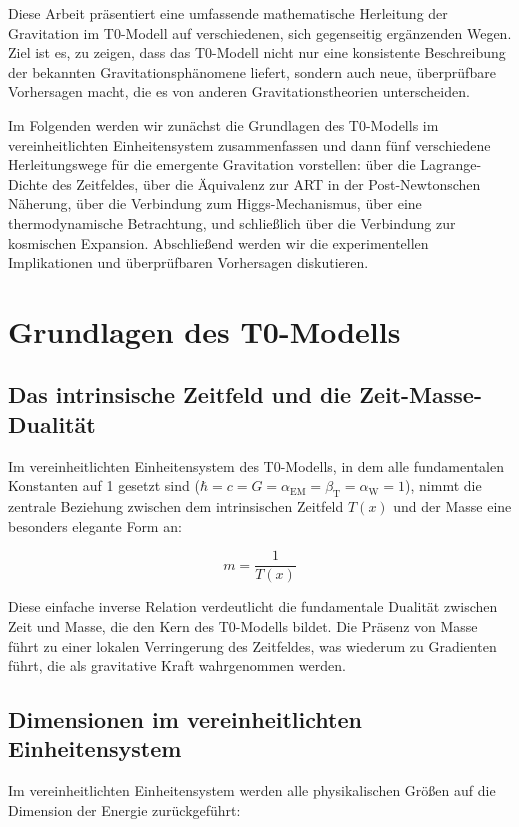 \documentclass[12pt,a4paper]{article}
\newcommand{\Tfield}{T(x)}
\newcommand{\betaT}{\beta_{\text{T}}}
\newcommand{\alphaEM}{\alpha_{\text{EM}}}
\newcommand{\alphaW}{\alpha_{\text{W}}}
\begin{document}
	Diese Arbeit präsentiert eine umfassende mathematische Herleitung der Gravitation im T0-Modell auf verschiedenen, sich gegenseitig ergänzenden Wegen. Ziel ist es, zu zeigen, dass das T0-Modell nicht nur eine konsistente Beschreibung der bekannten Gravitationsphänomene liefert, sondern auch neue, überprüfbare Vorhersagen macht, die es von anderen Gravitationstheorien unterscheiden.
	
	Im Folgenden werden wir zunächst die Grundlagen des T0-Modells im vereinheitlichten Einheitensystem zusammenfassen und dann fünf verschiedene Herleitungswege für die emergente Gravitation vorstellen: über die Lagrange-Dichte des Zeitfeldes, über die Äquivalenz zur ART in der Post-Newtonschen Näherung, über die Verbindung zum Higgs-Mechanismus, über eine thermodynamische Betrachtung, und schließlich über die Verbindung zur kosmischen Expansion. Abschließend werden wir die experimentellen Implikationen und überprüfbaren Vorhersagen diskutieren.
	
	\section{Grundlagen des T0-Modells}
	
	\subsection{Das intrinsische Zeitfeld und die Zeit-Masse-Dualität}
	Im vereinheitlichten Einheitensystem des T0-Modells, in dem alle fundamentalen Konstanten auf 1 gesetzt sind (\(\hbar = c = G = \alphaEM = \betaT = \alphaW = 1\)), nimmt die zentrale Beziehung zwischen dem intrinsischen Zeitfeld \(\Tfield\) und der Masse eine besonders elegante Form an:
	
	\begin{equation}
		m = \frac{1}{\Tfield}
	\end{equation}
	
	Diese einfache inverse Relation verdeutlicht die fundamentale Dualität zwischen Zeit und Masse, die den Kern des T0-Modells bildet. Die Präsenz von Masse führt zu einer lokalen Verringerung des Zeitfeldes, was wiederum zu Gradienten führt, die als gravitative Kraft wahrgenommen werden.
	
	\subsection{Dimensionen im vereinheitlichten Einheitensystem}
	Im vereinheitlichten Einheitensystem werden alle physikalischen Größen auf die Dimension der Energie zurückgeführt:
	
\end{document}
